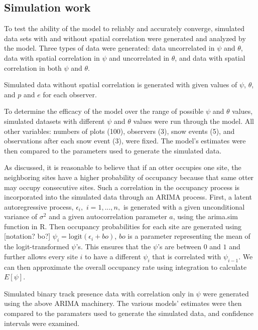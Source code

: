 \documentclass[11pt]{article}
\begin{document}
    \subsection{Simulation work}

    To test the ability of the model to reliably and accurately converge,
    simulated data sets with and without spatial correlation were generated and
    analyzed by the model. Three types of data were generated: data
    uncorrelated in \(\psi\) and \(\theta\), data with spatial correlation in
    \(\psi\) and uncorrelated in \(\theta\), and data with spatial correlation
    in both \(\psi\) and \(\theta\).

    Simulated data without spatial correlation is generated with given values
    of $\psi$, $\theta$, and $p$ and $e$ for each observer.

    To determine the efficacy of the model over the range of possible \(\psi\)
    and \(\theta\) values, simulated datasets with different \(\psi\) and
    \(\theta\) values were run through the model. All other variables: numbers
    of plots (100), observers (3), snow events (5), and observations after each
    snow event (3), were fixed. The model's estimates were then compared to the
    parameters used to generate the simulated data.

    As discussed, it is reasonable to believe that if an otter occupies one
    site, the neighboring sites have a higher probability of occupancy because
    that same otter may occupy consecutive sites.  Such a correlation in the
    occupancy process is incorporated into the simulated data through an ARIMA
    process.  First, a latent autoregressive process, \(\epsilon_i,\)
    \(i=1,...,n,\) is generated with a given unconditional variance of
    \(\sigma^2\) and a given autocorrelation parameter \(a\), using the
    arima.sim function in R.  Then occupancy probabilities for each site are
    generated using [notation? bo?] \(\psi_i=\mbox{logit}(\epsilon_i+bo)\),
    \(bo\) is a parameter representing the mean of the logit-transformed
    \(\psi\)'s.  This ensures that the \(\psi\)'s are between \(0\) and \(1\)
    and further allows every site \(i\) to have a different \(\psi_i\) that is
    correlated with \(\psi_{i-1}\).  We can then approximate the overall
    occupancy rate using integration to calculate \(E[\psi]\).

    Simulated binary track presence data with correlation only in \(\psi\) were
    generated using the above ARIMA machinery. The various models' estimates
    were then compared to the paramaters used to generate the simulated data,
    and confidence intervals were examined.
\end{document}
